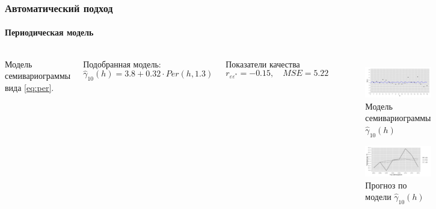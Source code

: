 \documentclass[10pt,pdf,aspectratio=169,hyperref={unicode}]{beamer}
\begin{document}
\begin{frame}
  \frametitle{Автоматический подход}
  \framesubtitle{Периодическая модель}
  \begin{columns}[c]
  \column{3in}
  Модель семивариограммы вида \eqref{eq:per}.

  \vspace{0.5em}

  Подобранная модель:
  \begin{equation}
  \label{eq:gamma10}
    \widehat{\gamma}_{10}(h) = 3.8 + 0.32 \cdot Per(h, 1.3)
  \end{equation}

  Показатели качества
  \begin{equation*}
    r_{\varepsilon\varepsilon^{*}} = -0.15, \quad MSE = 5.22
  \end{equation*}

  \column{3in}
  \vspace{-14.5pt}
  \begin{figure}[H]
    \includegraphics[width=0.9\linewidth]{../../figures/variogram/auto-class-18-modeled.png} \\
    \caption{Модель семивариограммы $\widehat{\gamma}_{10}(h)$}
    \includegraphics[width=0.9\linewidth]{../../figures/variogram/auto-class-18-cross-prediction.png}
    \caption{Прогноз по модели $\widehat{\gamma}_{10}(h)$}
  \end{figure}
  \end{columns}
\end{frame}
\end{document}
